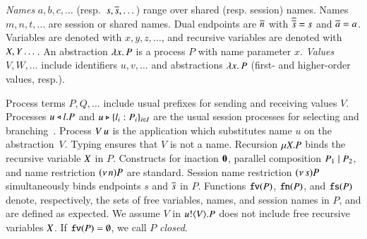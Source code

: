 \documentclass[preprint,11pt]{elsarticle}
\begin{document}
{%
\emph{Names} $a,b,c, \dots$ (resp.~$s, \overline{s}, \dots$) 
range over shared (resp. session) names. 
Names $m, n, t, \dots$ are session or shared names.
Dual endpoints are $\overline{n}$ with
$\overline{\overline{s}} = s$ and $\overline{a} = a$.
Variables are denoted with $x, y, z, \dots$, 
and recursive variables are denoted with $X, Y \dots$.
An abstraction %
$\lambda x.\,P$ is a process $P$ with name parameter $x$.
\emph{Values} $V,W, \ldots$ include 
identifiers $u, v, \ldots$ %
and 
abstractions $\lambda x.\,P$ (first- and higher-order values, resp.). 


Process terms $P, Q, \ldots$ 
include usual %
prefixes for sending and receiving values $V$.
Processes $u \triangleleft l . P$ and $u \triangleright \{l_i: P_i\}_{i \in I}$ are the
usual session processes for selecting and branching~\cite{honda.vasconcelos.kubo:language-primitives}.
Process 
$V\, {u}$ 
is the application
which substitutes name $u$ on the abstraction~$V$. 
Typing  ensures that $V$ is not a name.
Recursion   $\mu X. P$ binds the recursive variable $X$ in   $P$.
Constructs for 
inaction $\mathbf{0}$,  parallel composition $P_1 \;|\; P_2$, and 
name restriction $(\nu\, n) P$ are standard.
Session name restriction $(\nu\, s) P$ simultaneously binds endpoints $s$ and $\overline{s}$ in $P$.
Functions $\mathtt{fv}(P)$, $\mathtt{fn}(P)$, and $\mathtt{fs}(P)$ denote, respectively, the sets of free 
variables, names, and session names in $P$, and are defined as expected.
We assume $V$ in $u ! \langle V \rangle .{P}$ does not include free recursive 
variables $X$.
If $\mathtt{fv}(P) = \emptyset$, we call $P$ {\em closed}.




}
\end{document}

